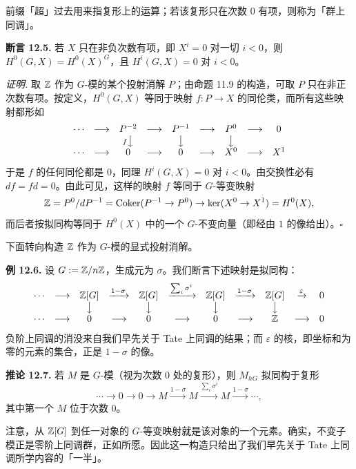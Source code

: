前缀「超」过去用来指复形上的运算；若该复形只在次数 $0$ 有项，则称为「群上同调」。

\textbf{断言 12.5.} 若 $X$ 只在非负次数有项，即 $X^i=0$ 对一切 $i<0$，则 $H^0(G,X)=H^0(X)^G$，且 $H^i(G,X)=0$ 对 $i<0$。

\textit{证明.} 取 $\mathbb{Z}$ 作为 $G$-模的某个投射消解 $P$；由命题 11.9 的构造，可取 $P$ 只在非正次数有项。按定义，$H^0(G,X)$ 等同于映射 $f\colon P\to X$ 的同伦类，而所有这些映射都形如
\[
\begin{array}{ccccccccc}
\cdots & \longrightarrow & P^{-2} & \longrightarrow & P^{-1} & \longrightarrow & P^0 & \longrightarrow & 0\\
& & {\scriptstyle f}\big\downarrow & & \big\downarrow & & \big\downarrow & & \\
\cdots & \longrightarrow & 0 & \longrightarrow & 0 & \longrightarrow & X^0 & \longrightarrow & X^1
\end{array}
\]
于是 $f$ 的任何同伦都是 $0$，同理 $H^i(G,X)=0$ 对 $i<0$。由交换性必有 $df=fd=0$。由此可见，这样的映射 $f$ 等同于 $G$-等变映射
\[
\mathbb{Z}=P^0/dP^{-1}=\operatorname{Coker}(P^{-1}\to P^0)\to\ker(X^0\to X^1)=H^0(X),
\]
而后者按拟同构等同于 $H^0(X)$ 中的一个 $G$-不变向量（即经由 $1$ 的像给出）。\hfill$\square$

下面转向构造 $\mathbb{Z}$ 作为 $G$-模的显式投射消解。

\textbf{例 12.6.} 设 $G:=\mathbb{Z}/n\mathbb{Z}$，生成元为 $\sigma$。我们断言下述映射是拟同构：
\[
\begin{array}{ccccccccccc}
\cdots & \longrightarrow & \mathbb{Z}[G] & \xrightarrow{1-\sigma} & \mathbb{Z}[G] & \xrightarrow{\sum_i\sigma^i} & \mathbb{Z}[G] & \xrightarrow{1-\sigma} & \mathbb{Z}[G] & \xrightarrow{\varepsilon} & 0\\
& & \big\downarrow & & \big\downarrow & & \big\downarrow & & \big\downarrow & & \\
\cdots & \longrightarrow & 0 & \longrightarrow & 0 & \longrightarrow & 0 & \longrightarrow & \mathbb{Z} & \longrightarrow & 0
\end{array}
\]
负阶上同调的消没来自我们早先关于 Tate 上同调的结果；而 $\varepsilon$ 的核，即坐标和为零的元素的集合，正是 $1-\sigma$ 的像。

\textbf{推论 12.7.} 若 $M$ 是 $G$-模（视为次数 $0$ 处的复形），则 $M_{hG}$ 拟同构于复形
\[
\cdots\to0\to0\to M\xrightarrow{1-\sigma}M\xrightarrow{\sum_i\sigma^i}M\xrightarrow{1-\sigma}\cdots,
\]
其中第一个 $M$ 位于次数 $0$。

注意，从 $\mathbb{Z}[G]$ 到任一对象的 $G$-等变映射就是该对象的一个元素。确实，不变子模正是零阶上同调群，正如所愿。因此这一构造只给出了我们早先关于 Tate 上同调所学内容的「一半」。

